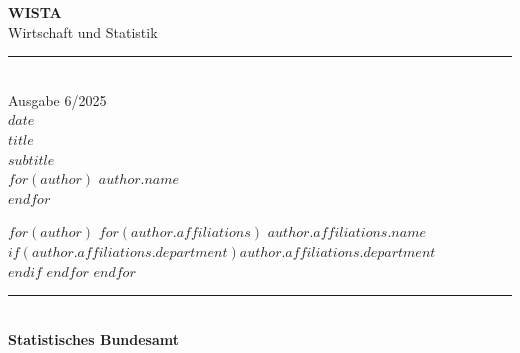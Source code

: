 \thispagestyle{empty}
\begin{center}

\vspace{2cm}
{\color{wistaBlue}\huge\textbf{WISTA}}\\[0.3cm]
{\color{wistaDarkGray}\Large Wirtschaft und Statistik}\\[0.5cm]
{\color{wistaBlue}\rule{0.5\textwidth}{1pt}}\\[1cm]

{\color{wistaLightGray}\large Ausgabe 6/2025}\\[0.3cm]
{\color{wistaLightGray}\normalsize $date$}\\[2cm]

{\color{wistaBlue}\Huge\textbf{$title$}}\\[0.8cm]

{\color{wistaDarkGray}\LARGE $subtitle$}\\[2cm]

$for(author)$
{\color{wistaDarkGray}\Large\textbf{$author.name$}}\\[0.5cm]
$endfor$

\vspace{1cm}
$for(author)$
$for(author.affiliations)$
{\color{wistaLightGray}\large $author.affiliations.name$}\\
$if(author.affiliations.department)${\color{wistaLightGray}\normalsize $author.affiliations.department$}\\[0.3cm]$endif$
$endfor$
$endfor$

\vfill

{\color{wistaBlue}\rule{\textwidth}{2pt}}\\[0.5cm]
{\color{wistaDarkGray}\Large\textbf{Statistisches Bundesamt}}

\end{center}
\newpage
\setcounter{page}{1}